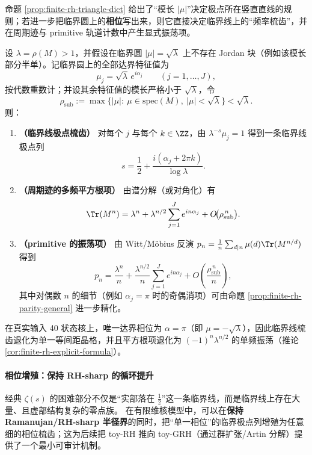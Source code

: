 \begin{remark}[零点—振荡字典：临界圆谱 \texorpdfstring{$\Rightarrow$}{=>} 临界线梳齿与多频平方根项]\label{rem:finite-rh-zero-oscillation-dict}
命题 \ref{prop:finite-rh-triangle-dict} 给出了“模长 \(|\mu|\)”决定极点所在竖直直线的规则；若进一步把临界圆上的\textbf{相位}写出来，则它直接决定临界线上的“频率梳齿”，并在周期迹与 primitive 轨道计数中产生显式振荡项。
\par
设 \(\lambda=\rho(M)>1\)，并假设在临界圆 \(|\mu|=\sqrt{\lambda}\) 上不存在 Jordan 块（例如该模长部分半单）。记临界圆上的全部达界特征值为
\[
\mu_j=\sqrt{\lambda}\,e^{i\alpha_j}\qquad(j=1,\dots,J),
\]
按代数重数计；并设其余特征值的模长严格小于 \(\sqrt{\lambda}\)，令
\[
\rho_{\mathrm{sub}}:=\max\{|\mu|:\ \mu\in\mathrm{spec}(M),\ |\mu|<\sqrt{\lambda}\}<\sqrt{\lambda}.
\]
则：
\begin{enumerate}
  \item \textbf{（临界线极点梳齿）} 对每个 \(j\) 与每个 \(k\in\ZZ\)，由 \(\lambda^{-s}\mu_j=1\) 得到一条临界线极点列
  \[
  s=\frac12+\frac{i(\alpha_j+2\pi k)}{\log\lambda}.
  \]
  \item \textbf{（周期迹的多频平方根项）} 由谱分解（或对角化）有
  \[
  \Tr(M^n)=\lambda^n+\lambda^{n/2}\sum_{j=1}^{J}e^{in\alpha_j}+O\!\bigl(\rho_{\mathrm{sub}}^{\,n}\bigr).
  \]
  \item \textbf{（primitive 的振荡项）} 由 Witt/Möbius 反演
  \(p_n=\frac{1}{n}\sum_{d\mid n}\mu(d)\Tr(M^{n/d})\)
  得到
  \[
  p_n=\frac{\lambda^n}{n}+\frac{\lambda^{n/2}}{n}\sum_{j=1}^{J}e^{in\alpha_j}
  +O\!\left(\frac{\rho_{\mathrm{sub}}^{\,n}}{n}\right),
  \]
  其中对偶数 \(n\) 的细节（例如 \(\alpha_j=\pi\) 时的奇偶消项）可由命题 \ref{prop:finite-rh-parity-general} 进一步精化。
\end{enumerate}
在真实输入 40 状态核上，唯一达界相位为 \(\alpha=\pi\)（即 \(\mu=-\sqrt{\lambda}\)），因此临界线梳齿退化为单一等间距晶格，并且平方根项退化为 \(({-}1)^n\lambda^{n/2}\) 的单频振荡（推论 \ref{cor:finite-rh-explicit-formula}）。
\end{remark}

\paragraph{相位增殖：保持 RH-sharp 的循环提升}
经典 \(\zeta(s)\) 的困难部分不仅是“实部落在 \(\tfrac12\)”这一条临界线，而是临界线上存在大量、且虚部结构复杂的零点族。
在有限维核模型中，可以在\textbf{保持 Ramanujan/RH-sharp 半径界}的同时，把“单一相位”的临界极点列增殖为任意细的相位梳齿；这为后续把 toy-RH 推向 toy-GRH（通过群扩张/Artin 分解）提供了一个最小可审计机制。

